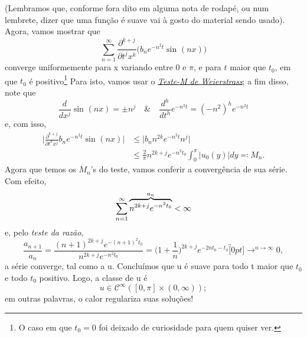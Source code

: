 \documentclass[../pde_notes.tex]{subfiles}
\begin{document}
(Lembramos que, conforme fora dito em alguma nota de rodapé, ou num lembrete, dizer que uma função é suave vai à gosto do material sendo usado). Agora, vamos mostrar que
\[
	\sum\limits_{n=1}^{\infty}\frac{\partial^{k+j}}{\partial t^{j}x^{k}}\biggl(b_{n}e^{-n^{2}t}\sin^{}{(nx)}\biggr)
\]
converge uniformemente para x variando entre 0 e \(\pi \), e para \(t\) maior que \(t_{0}\), em que \(t_{0}\) é positivo\footnote{O caso em que \(t_{0}=0\) foi deixado de curiosidade para quem quiser ver.} Para isto, vamos usar o \hyperlink{weierstrass_m}{\textit{Teste-M de Weierstrass}}; a fim disso, note que
\[
	\frac{d^{}}{dx^{j}}\sin^{}{(nx)} = \pm n^{j} \quad\&\quad \frac{d^{h}}{dt^{h}}e^{-n^{2}t} = (-n^{2})^{h}e^{-n^{2}t}
\]
e, com isso,
\begin{align*}
	\biggl\vert \frac{\partial^{k+j}}{\partial t^{k}x^{j}}b_{n}e^{-n^{2}t} \sin^{}{(nx)}\biggr\vert & \leq \biggl\vert b_{n}n^{2k}e^{-n^{2}t}n^{j} \biggr\vert                               \\
	                                                                                                & \leq \frac{2}{\pi }n^{2k+j}e^{-n^{2}t_{0}}\int_{0}^{\pi }|u_{0}(y)|dy \eqqcolon M_{n}.
\end{align*}
Agora que temos os \(M_{n}\)'s do teste, vamos conferir a convergência de sua série. Com efeito,
\[
	\sum\limits_{n=1}^{\infty}\overbrace{n^{2k+j}e^{-n^{2}t_{0}}}^{\mathclap{a_{n}}} < \infty
\]
e, pelo \textit{teste da razão},
\[
	\frac{a_{n+1}}{a_{n}} = \frac{(n+1)^{2k+j}e^{-(n+1)^{2}t_{0}}}{n^{2k+j}e^{-n^{2}t_{0}}}=\biggl(1+\frac{1}{n}\biggr)^{2k+j}e^{-2nt_{0}-t_{0}}\overbracket[0pt]{\longrightarrow}^{n\to \infty}0,
\]
a série converge, tal como a u. Concluímos que u é suave para todo t maior que \(t_{0}\) e todo \(t_{0}\) positivo. Logo, a classe de u é
\[
	u\in \mathcal{C}^{\infty}([0, \pi ]\times (0, \infty));
\]
em outras palavras, o calor regulariza suas soluções!
\end{document}
